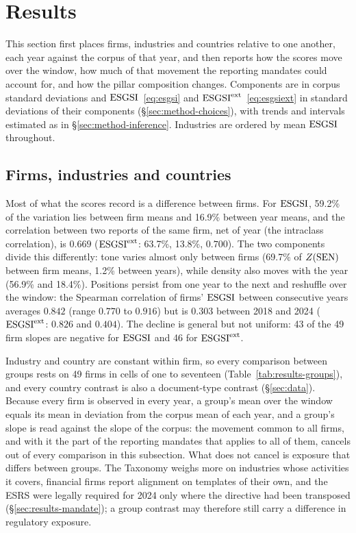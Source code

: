\section{Results}
\label{sec:results}

This section first places firms, industries and countries relative to one another, each year
against the corpus of that year, and then reports how the scores move over the window, how much
of that movement the reporting mandates could account for, and how the pillar composition
changes. Components are in corpus standard deviations and $\mathrm{ESGSI}$~\eqref{eq:esgsi} and
$\mathrm{ESGSI}^{\mathrm{ext}}$~\eqref{eq:esgsiext} in standard deviations of their components
(\S\ref{sec:method-choices}), with trends and intervals estimated as in
\S\ref{sec:method-inference}. Industries are ordered by mean $\mathrm{ESGSI}$ throughout.

\subsection{Firms, industries and countries}
\label{sec:results-groups}

Most of what the scores record is a difference between firms. For $\mathrm{ESGSI}$, 59.2\% of the
variation lies between firm means and 16.9\% between year means, and the correlation between two
reports of the same firm, net of year (the intraclass correlation), is $0.669$ ($\mathrm{ESGSI}^{\mathrm{ext}}$:
63.7\%, 13.8\%, $0.700$). The two components divide this differently: tone varies almost only
between firms (69.7\% of $Z(\mathrm{SEN})$ between firm means, 1.2\% between years), while density
also moves with the year (56.9\% and 18.4\%). Positions persist from one year to the next and
reshuffle over the window: the Spearman correlation of firms' $\mathrm{ESGSI}$ between consecutive years
averages $0.842$ (range $0.770$ to $0.916$) but is $0.303$ between 2018 and 2024 ($\mathrm{ESGSI}^{\mathrm{ext}}$:
$0.826$ and $0.404$). The decline is general but not uniform: 43 of the 49 firm slopes are negative
for $\mathrm{ESGSI}$ and 46 for $\mathrm{ESGSI}^{\mathrm{ext}}$.

Industry and country are constant within firm, so every comparison between groups rests on 49
firms in cells of one to seventeen (Table~\ref{tab:results-groups}), and every country contrast
is also a document-type contrast (\S\ref{sec:data}). Because every firm is observed in every
year, a group's mean over the window equals its mean in deviation from the corpus mean of each
year, and a group's slope is read against the slope of the corpus: the movement common to all
firms, and with it the part of the reporting mandates that applies to all of them, cancels out
of every comparison in this subsection. What does not cancel is exposure that differs between
groups. The Taxonomy weighs more on industries whose activities it covers, financial firms report
alignment on templates of their own, and the ESRS were legally required for 2024 only where the
directive had been transposed (\S\ref{sec:results-mandate}); a group contrast may therefore still
carry a difference in regulatory exposure.


